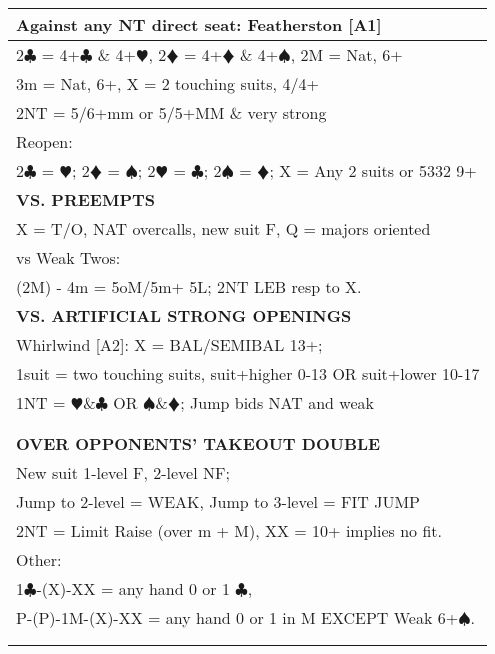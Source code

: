 \documentclass{article}
\newcommand\C{\ensuremath{\clubsuit}}
\newcommand\D{\color{red}\ensuremath{\vardiamondsuit}}
\renewcommand\H{\color{red}\ensuremath{\varheartsuit}}
\renewcommand\S{\ensuremath{\spadesuit}}
\newcommand\N{{\footnotesize NT}}
\newcommand\X{{\footnotesize X}}
\newcommand\XX{{\footnotesize XX}}
\begin{document}
{\begin{minipage}{90mm}
\begin{tabular}{| p{88mm} |}
		Against any NT direct seat: Featherston [A1]\\ \hline
		2{\C} = 4+{\C} \& 4+{\H}, 2{\D} = 4+{\D} \& 4+{\S}, 2M = Nat, 6+\\ \hline
		3m = Nat, 6+, X = 2 touching suits, 4/4+\\ \hline
		2{\N} = 5/6+mm or 5/5+MM \& very strong \\ \hline
		Reopen:\\ \hline
		2{\C} = {\H}; 2{\D} = {\S}; 2{\H} = {\C}; 2{\S} = {\D}; X = Any 2 suits or 5332 9+\\ \hline
		\cellcolor{orange!25}\textbf{VS. PREEMPTS} \\ \hline
		X = T/O, NAT overcalls, new suit F, Q = majors oriented\\ \hline
		vs Weak Twos:\\ \hline
		(2M) - 4m = 5oM/5m+ 5L; 2NT LEB resp to X.\\ \hline
		\cellcolor{orange!25}\textbf{VS. ARTIFICIAL STRONG OPENINGS} \\ \hline
		Whirlwind [A2]: X = BAL/SEMIBAL 13+; \\ \hline
		1suit = two touching suits,  suit+higher 0-13 OR suit+lower 10-17\\ \hline
		1{\N} = {\H}\&{\C} OR {\S}\&{\D}; Jump bids NAT and weak\\ \hline
		\\ \hline
		\\ \hline
		\cellcolor{orange!25}\textbf{OVER OPPONENTS' TAKEOUT DOUBLE} \\ \hline
		New suit 1-level F, 2-level NF;\\ \hline
		Jump to 2-level = WEAK, Jump to 3-level = FIT JUMP\\ \hline
		2{\N} = Limit Raise (over m + M), XX = 10+ implies no fit.\\ \hline
		Other:\\ \hline
		1{\C}-(\X)-{\XX} = any hand 0 or 1 {\C},\\ \hline
		P-(P)-1M-(\X)-{\XX} = any hand 0 or 1 in M EXCEPT Weak 6+{\S}.\\ \hline
		\\ \hline
		\\ \hline
	\end{tabular}
\end{minipage}
}
\begin{minipage}{5mm}
	\begin{tabular}{| p{5mm} |}
	\end{tabular}
\end{minipage}
\end{document}
